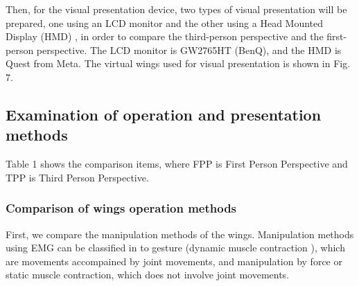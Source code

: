 \documentclass[letterpaper, 10 pt, conference]{ieeeconf}  %
\begin{document}
                Then, for the visual presentation device, two types of visual presentation will be prepared, one using an LCD monitor and the other using a Head Mounted Display (HMD) , in order to compare the third-person perspective and the first-person perspective.  
                The LCD monitor is GW2765HT (BenQ), and the HMD is Quest from Meta. 
                The virtual wings used for visual presentation is shown in Fig. 7.  

        \subsection{Examination of operation and presentation methods}
                \begin{table}[tb]
                        \begin{center}
                        \caption{Comparison items}
                        \end{center}
                \end{table}

                Table 1 shows the comparison items, where FPP is First Person Perspective and TPP is Third Person Perspective.  

                \subsubsection{Comparison of wings operation methods}
                        First, we compare the manipulation methods of the wings.  
                        Manipulation methods using EMG can be classified in to gesture (dynamic muscle contraction\cite{thistle1967isokinetic} ), which are movements accompained by joint movements, and manipulation by force or static muscle contraction, which does not involve joint movements.  
                        
\end{document}
